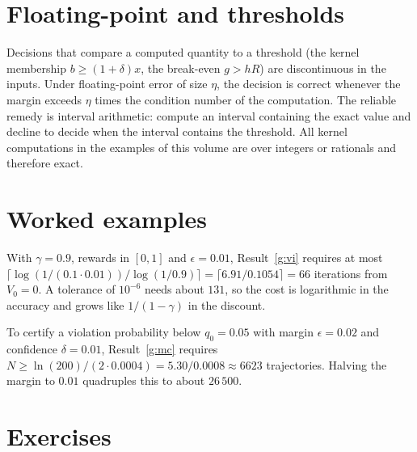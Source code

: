 \section{Floating-point and thresholds}

Decisions that compare a computed quantity to a threshold (the kernel membership $b\ge(1+\delta)x$, the break-even $g>hR$) are discontinuous in the inputs. Under floating-point error of size $\eta$, the decision is correct whenever the margin exceeds $\eta$ times the condition number of the computation. The reliable remedy is interval arithmetic: compute an interval containing the exact value and decline to decide when the interval contains the threshold. All kernel computations in the examples of this volume are over integers or rationals and therefore exact.

\section{Worked examples}

\begin{example}\label{g:ex-iter}
With $\gamma=0.9$, rewards in $[0,1]$ and $\epsilon=0.01$, Result~\ref{g:vi} requires at most $\lceil\log(1/(0.1\cdot0.01))/\log(1/0.9)\rceil=\lceil6.91/0.1054\rceil=66$ iterations from $V_0=0$. A tolerance of $10^{-6}$ needs about $131$, so the cost is logarithmic in the accuracy and grows like $1/(1-\gamma)$ in the discount.
\end{example}

\begin{example}\label{g:ex-mc}
To certify a violation probability below $q_0=0.05$ with margin $\epsilon=0.02$ and confidence $\delta=0.01$, Result~\ref{g:mc} requires $N\ge\ln(200)/(2\cdot0.0004)=5.30/0.0008\approx6623$ trajectories. Halving the margin to $0.01$ quadruples this to about $26\,500$.
\end{example}

\section*{Exercises}

